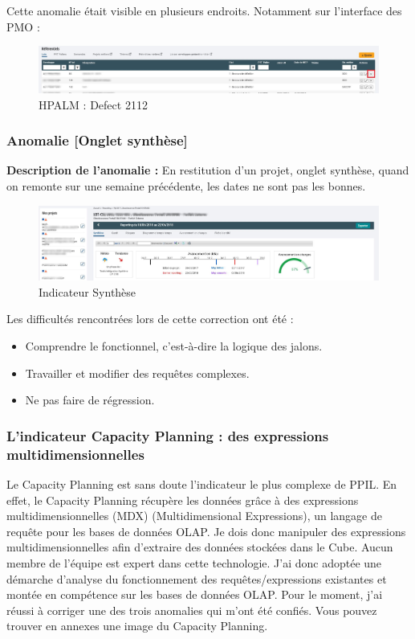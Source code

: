 Cette anomalie était visible en plusieurs endroits. Notamment sur l'interface des PMO :

\begin{figure}[!h]
\centering
\includegraphics[width=1\textwidth]{images/ano2-censored.png}
\caption{HPALM : Defect 2112}
\end{figure}


\subsubsection{Anomalie [Onglet synthèse]}

\textbf{Description de l'anomalie :} En restitution d'un projet, onglet synthèse, quand on remonte sur une semaine précédente, les dates ne sont pas les bonnes. 

\begin{figure}[!h]
\centering
\includegraphics[width=1\textwidth]{images/ppil-indicateur-synthese-censored.png}
\caption{Indicateur Synthèse}
\end{figure}

Les difficultés rencontrées lors de cette correction ont été :
\begin{itemize}
    \item Comprendre le fonctionnel, c'est-à-dire la logique des jalons.
    \item Travailler et modifier des requêtes complexes.
    \item Ne pas faire de régression.
\end{itemize}


\subsubsection{L'indicateur Capacity Planning : des expressions multidimensionnelles}

Le Capacity Planning est sans doute l'indicateur le plus complexe de PPIL. En effet, le Capacity Planning récupère les données grâce à des expressions multidimensionnelles (MDX) (Multidimensional Expressions), un langage de requête pour les bases de données OLAP. Je dois donc manipuler des expressions multidimensionnelles afin d'extraire des données stockées dans le Cube. Aucun membre de l'équipe est expert dans cette technologie. J'ai donc adoptée une démarche d'analyse du fonctionnement des requêtes/expressions existantes et montée en compétence sur les bases de données OLAP. Pour le moment, j'ai réussi à corriger une des trois anomalies qui m'ont été confiés. Vous pouvez trouver en annexes une image du Capacity Planning.

